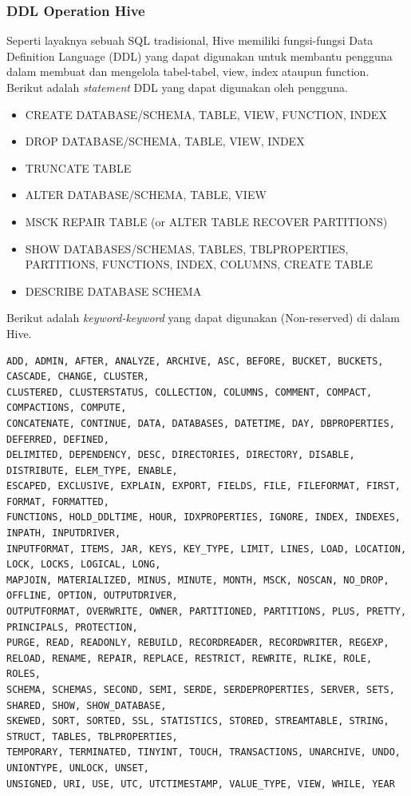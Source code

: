 \subsubsection{DDL Operation Hive}
Seperti layaknya sebuah SQL tradisional, Hive memiliki fungsi-fungsi Data Definition Language (DDL) yang dapat digunakan untuk membantu pengguna dalam membuat dan mengelola tabel-tabel, view, index ataupun function. Berikut adalah \textit{statement} DDL yang dapat digunakan oleh pengguna.

\begin{itemize}
	\item CREATE DATABASE/SCHEMA, TABLE, VIEW, FUNCTION, INDEX
	\item DROP DATABASE/SCHEMA, TABLE, VIEW, INDEX
	\item TRUNCATE TABLE
	\item ALTER DATABASE/SCHEMA, TABLE, VIEW
	\item MSCK REPAIR TABLE (or ALTER TABLE RECOVER PARTITIONS)
	\item SHOW DATABASES/SCHEMAS, TABLES, TBLPROPERTIES, PARTITIONS, FUNCTIONS, INDEX, COLUMNS, CREATE TABLE
	\item DESCRIBE DATABASE SCHEMA
\end{itemize}

Berikut adalah \textit{keyword-keyword} yang dapat digunakan (Non-reserved) di dalam Hive.

\begin{lstlisting}[basicstyle=\tiny,caption=Non-reserved Keywords]
ADD, ADMIN, AFTER, ANALYZE, ARCHIVE, ASC, BEFORE, BUCKET, BUCKETS, CASCADE, CHANGE, CLUSTER, 
CLUSTERED, CLUSTERSTATUS, COLLECTION, COLUMNS, COMMENT, COMPACT, COMPACTIONS, COMPUTE, 
CONCATENATE, CONTINUE, DATA, DATABASES, DATETIME, DAY, DBPROPERTIES, DEFERRED, DEFINED, 
DELIMITED, DEPENDENCY, DESC, DIRECTORIES, DIRECTORY, DISABLE, DISTRIBUTE, ELEM_TYPE, ENABLE, 
ESCAPED, EXCLUSIVE, EXPLAIN, EXPORT, FIELDS, FILE, FILEFORMAT, FIRST, FORMAT, FORMATTED, 
FUNCTIONS, HOLD_DDLTIME, HOUR, IDXPROPERTIES, IGNORE, INDEX, INDEXES, INPATH, INPUTDRIVER, 
INPUTFORMAT, ITEMS, JAR, KEYS, KEY_TYPE, LIMIT, LINES, LOAD, LOCATION, LOCK, LOCKS, LOGICAL, LONG, 
MAPJOIN, MATERIALIZED, MINUS, MINUTE, MONTH, MSCK, NOSCAN, NO_DROP, OFFLINE, OPTION, OUTPUTDRIVER, 
OUTPUTFORMAT, OVERWRITE, OWNER, PARTITIONED, PARTITIONS, PLUS, PRETTY, PRINCIPALS, PROTECTION, 
PURGE, READ, READONLY, REBUILD, RECORDREADER, RECORDWRITER, REGEXP, 
RELOAD, RENAME, REPAIR, REPLACE, RESTRICT, REWRITE, RLIKE, ROLE, ROLES, 
SCHEMA, SCHEMAS, SECOND, SEMI, SERDE, SERDEPROPERTIES, SERVER, SETS, SHARED, SHOW, SHOW_DATABASE, 
SKEWED, SORT, SORTED, SSL, STATISTICS, STORED, STREAMTABLE, STRING, STRUCT, TABLES, TBLPROPERTIES, 
TEMPORARY, TERMINATED, TINYINT, TOUCH, TRANSACTIONS, UNARCHIVE, UNDO, UNIONTYPE, UNLOCK, UNSET, 
UNSIGNED, URI, USE, UTC, UTCTIMESTAMP, VALUE_TYPE, VIEW, WHILE, YEAR
\end{lstlisting}

